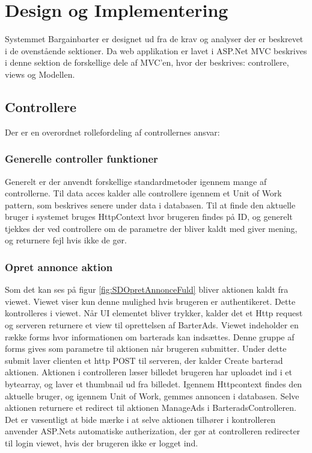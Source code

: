 \chapter{Design og Implementering}
Systemmet Bargainbarter er designet ud fra de krav og analyser der er beskrevet i de ovenstående sektioner. Da web applikation er lavet i ASP.Net MVC beskrives i denne sektion de forskellige dele af MVC'en, hvor der beskrives: controllere, views og Modellen. 


\section{Controllere}
Der er en overordnet rollefordeling af controllernes ansvar: 



\subsection{Generelle controller funktioner}

Generelt er der anvendt forskellige standardmetoder igennem mange af controllerne. Til data acces kalder alle controllere igennem et Unit of Work pattern, som beskrives senere under data i databasen. Til at finde den aktuelle bruger i systemet bruges HttpContext hvor brugeren findes på ID, og generelt tjekkes der ved controllere om de parametre der bliver kaldt med giver mening, og returnere fejl hvis ikke de gør.  

\subsection{Opret annonce aktion}

Som det kan ses på figur \ref{fig:SDOpretAnnonceFuld} bliver aktionen kaldt fra viewet. Viewet viser kun denne mulighed hvis brugeren er authentikeret. Dette kontrolleres i viewet. Når UI elementet bliver trykker, kalder det et Http request og serveren returnere et view til oprettelsen af BarterAds. Viewet indeholder en række forms hvor informationen om barterads kan indsættes. Denne gruppe af forms gives som parametre til aktionen når brugeren submitter. Under dette submit laver clienten et http POST til serveren, der kalder Create barterad aktionen. Aktionen i controlleren læser billedet brugeren har uploadet ind i et bytearray, og laver et thumbnail ud fra billedet. Igennem Httpcontext findes den aktuelle bruger, og igennem Unit of Work, gemmes annoncen i databasen. Selve aktionen returnere et redirect til aktionen ManageAds i BarteradsControlleren. Det er væsentligt at bide mærke i at selve aktionen tilhører i kontrolleren anvender ASP.Nets automatiske autherization, der gør at controlleren redirecter til login viewet, hvis der brugeren ikke er logget ind.


